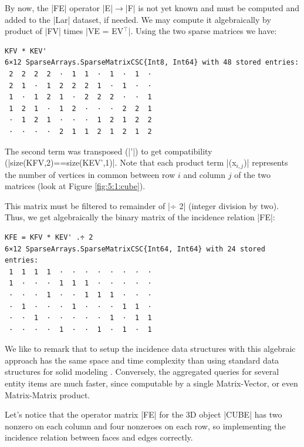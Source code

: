 \begin{coding}[Algebraic computation of FE = $\delta_1$]
By now, the |FE| operator |E|$ \to $|F| is not yet known and must be computed and added to the |Lar| dataset, if needed. 
We may compute it algebraically by product of |FV| times |VE = EV$^\top$|.  Using the two  sparse matrices we have:
\begin{lstlisting}[language=JuliaLocal, style=julia, mathescape=true]
KFV * KEV'
6×12 SparseArrays.SparseMatrixCSC{Int8, Int64} with 48 stored entries:
 2  2  2  2  ⋅  1  1  ⋅  1  ⋅  1  ⋅
 2  1  ⋅  1  2  2  2  1  ⋅  1  ⋅  ⋅
 1  ⋅  1  2  1  ⋅  2  2  2  ⋅  ⋅  1
 1  2  1  ⋅  1  2  ⋅  ⋅  ⋅  2  2  1
 ⋅  1  2  1  ⋅  ⋅  ⋅  1  2  1  2  2
 ⋅  ⋅  ⋅  ⋅  2  1  1  2  1  2  1  2
\end{lstlisting}
The second term was transposed (|'|) to get compatibility (|size(KFV,2)==size(KEV’,1)|.
Note that each product term |(x$_{i,j}$)| represents the number of vertices in common between row $i$ and column $j$ of the two matrices (look at Figure \ref{fig:5:1:cube}).

This matrix must be filtered to remainder of |÷ 2| (integer division by two).
Thus, we get algebraically the binary matrix of the incidence relation |FE|:
\begin{lstlisting}[language=JuliaLocal, style=julia, mathescape=true]
KFE = KFV * KEV' .÷ 2
6×12 SparseArrays.SparseMatrixCSC{Int64, Int64} with 24 stored entries:
 1  1  1  1  ⋅  ⋅  ⋅  ⋅  ⋅  ⋅  ⋅  ⋅
 1  ⋅  ⋅  ⋅  1  1  1  ⋅  ⋅  ⋅  ⋅  ⋅
 ⋅  ⋅  ⋅  1  ⋅  ⋅  1  1  1  ⋅  ⋅  ⋅
 ⋅  1  ⋅  ⋅  ⋅  1  ⋅  ⋅  ⋅  1  1  ⋅
 ⋅  ⋅  1  ⋅  ⋅  ⋅  ⋅  ⋅  1  ⋅  1  1
 ⋅  ⋅  ⋅  ⋅  1  ⋅  ⋅  1  ⋅  1  ⋅  1
\end{lstlisting}

\begin{remark}
We like to remark that to setup the incidence data structures with this algebraic approach has the same space and time complexity than using standard data structures for solid modeling \cite{DBLP:journals/cad/DiCarloPS14}. Conversely, the aggregated queries for several entity items are much faster, since computable by a single Matrix-Vector, or even  Matrix-Matrix product.
\end{remark}
\begin{remark}
Let’s notice that the operator matrix |FE| for the 3D object |CUBE| has two nonzero on each column and four nonzeroes on each row, so implementing the incidence relation between faces and edges correctly.
\end{remark}




\end{coding}
